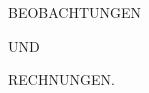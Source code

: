 \newcommand{\EarthSymbol}{\text{\mdseries\AstroSymbols ♁}}
\clearpage\thispagestyle{empty}%
\begin{center}
\vspace*{.22\textheight}
{\Large BEOBACHTUNGEN\par}
\vspace{14mm}
UND\par
\vspace{14mm}
{\Large RECHNUNGEN.\par}
\end{center}
\clearpage
